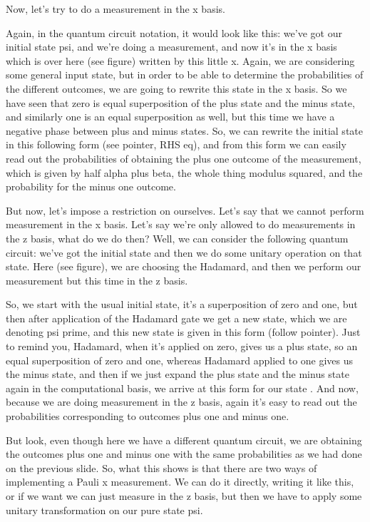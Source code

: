 Now, let's try to do a measurement in the x basis.

Again, in the quantum circuit notation, it would look like this: we've got our initial state psi, and we're doing a measurement, and now it's in the x basis which is over here (see figure) written by this little x. Again, we are considering some general input state, but in order to be able to determine the probabilities of the different outcomes, we are going to rewrite this state in the x basis. So we have seen that zero is equal superposition of the plus state and the minus state, and similarly one is an equal superposition as well, but this time we have a negative phase between plus and minus states. So, we can rewrite the initial state in this following form (see pointer, RHS eq), and from this form we can easily read out the probabilities of obtaining the plus one outcome of the measurement, which is given by half alpha plus beta, the whole thing modulus squared, and the probability for the minus one outcome.

But now, let's impose a restriction on ourselves. Let's say that we cannot perform measurement in the x basis. Let's say we're only allowed to do measurements in the z basis, what do we do then? Well, we can consider the following quantum circuit: we've got the initial state and then we do some unitary operation on that state. Here (see figure), we are choosing the Hadamard, and then we perform our measurement but this time in the z basis.

So, we start with the usual initial state, it's a superposition of zero and one, but then after application of the Hadamard gate we get a new state, which we are denoting psi prime, and this new state is given in this form (follow pointer). Just to remind you, Hadamard, when it's applied on zero, gives us a plus state, so an equal superposition of zero and one, whereas Hadamard applied to one gives us the minus state, and then if we just expand the plus state and the minus state again in the computational basis, we arrive at this form for our state \ket{\Psi^+}. And now, because we are doing measurement in the z basis, again it's easy to read out the probabilities corresponding to outcomes plus one and minus one.

But look, even though here we have a different quantum circuit, we are obtaining the outcomes plus one and minus one with the same probabilities as we had done on the previous slide. So, what this shows is that there are two ways of implementing a Pauli x measurement. We can do it directly, writing it like this, or if we want we can just measure in the z basis, but then we have to apply some unitary transformation on our pure state psi.

